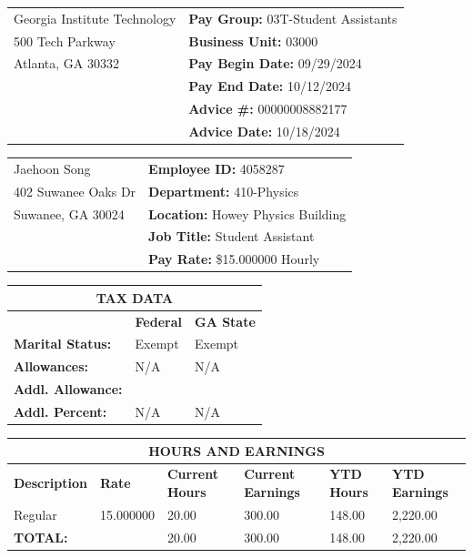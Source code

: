\documentclass[12pt]{article}
\begin{document}
\scriptsize

\begin{tabular}{p{3.8in}p{2.5in}}
    Georgia Institute Technology & \textbf{Pay Group:} 03T-Student Assistants \\
    500 Tech Parkway & \textbf{Business Unit:} 03000 \\
    Atlanta, GA 30332 & \textbf{Pay Begin Date:} 09/29/2024 \\
    & \textbf{Pay End Date:} 10/12/2024 \\
    & \textbf{Advice \#:} 00000008882177 \\
    & \textbf{Advice Date:} 10/18/2024 \\
\end{tabular}

\vspace{0.25in}

\begin{tabular}{|p{3.8in}|p{2.5in}|}
    \hline
    Jaehoon Song & \textbf{Employee ID:} 4058287 \\
    402 Suwanee Oaks Dr & \textbf{Department:} 410-Physics \\
    Suwanee, GA 30024 & \textbf{Location:} Howey Physics Building \\
    & \textbf{Job Title:} Student Assistant \\
    & \textbf{Pay Rate:} \$15.000000 Hourly \\
    \hline
\end{tabular}

\vspace{0.25in}

\begin{tabular}{|p{2.5in}|p{1in}|p{1in}|}
    \hline
    \multicolumn{3}{|c|}{\textbf{TAX DATA}} \\
    \hline
    & \textbf{Federal} & \textbf{GA State} \\
    \hline
    \textbf{Marital Status:} & Exempt & Exempt \\
    \textbf{Allowances:} & N/A & N/A \\
    \textbf{Addl. Allowance:} & & \\
    \textbf{Addl. Percent:} & N/A & N/A \\
    \hline
\end{tabular}

\vspace{0.25in}

\begin{tabular}{|p{1.2in}|p{0.8in}|p{0.8in}|p{1in}|p{0.8in}|p{1.2in}|}
    \hline
    \multicolumn{6}{|c|}{\textbf{HOURS AND EARNINGS}} \\
    \hline
    \textbf{Description} & \textbf{Rate} & \textbf{Current Hours} & \textbf{Current Earnings} & \textbf{YTD Hours} & \textbf{YTD Earnings} \\
    \hline
    Regular & 15.000000 & 20.00 & 300.00 & 148.00 & 2,220.00 \\
    \hline
    \multicolumn{2}{|l|}{\textbf{TOTAL:}} & 20.00 & 300.00 & 148.00 & 2,220.00 \\
    \hline
\end{tabular}
\end{document}
